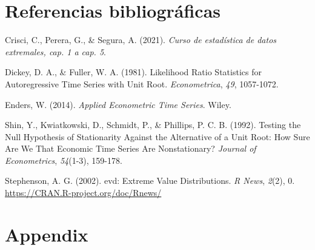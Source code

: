 \documentclass[
  12pt]{article}
\newlength{\cslhangindent}
\newenvironment{CSLReferences}[2] %
 {\begin{list}{}{%
  \setlength{\itemindent}{0pt}
  \setlength{\leftmargin}{0pt}
  \setlength{\parsep}{0pt}
  \ifodd #1
   \setlength{\leftmargin}{\cslhangindent}
   \setlength{\itemindent}{-1\cslhangindent}
  \fi
  \setlength{\itemsep}{#2\baselineskip}}}
 {\end{list}}
\begin{document}
\section{Referencias bibliográficas}

\label{refs}
\begin{CSLReferences}{1}{0}
Crisci, C., Perera, G., \& Segura, A. (2021). \emph{Curso de estadística
de datos extremales, cap. 1 a cap. 5}.

Dickey, D. A., \& Fuller, W. A. (1981). Likelihood Ratio Statistics for
Autoregressive Time Series with Unit Root. \emph{Econometrica},
\emph{49}, 1057-1072.

Enders, W. (2014). \emph{Applied Econometric Time Series}. Wiley.

Shin, Y., Kwiatkowski, D., Schmidt, P., \& Phillips, P. C. B. (1992).
Testing the Null Hypothesis of Stationarity Against the Alternative of a
Unit Root: How Sure Are We That Economic Time Series Are Nonstationary?
\emph{Journal of Econometrics}, \emph{54}(1-3), 159-178.

Stephenson, A. G. (2002). evd: Extreme Value Distributions. \emph{R
News}, \emph{2}(2), 0. \url{https://CRAN.R-project.org/doc/Rnews/}

\end{CSLReferences}

\newpage

\section{Appendix}\label{appendix}
\end{document}
